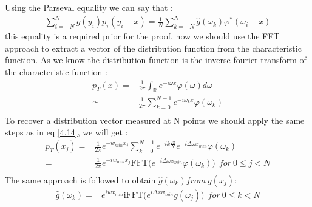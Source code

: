 \documentclass[12pt]{report}
\begin{document}
Using the Parseval equality we can say that :
\begin{align}
\sum_{i=-N}^{N}g(y_i)p_{\tau}(y_i-x)=\frac{1}{N}\sum_{k=-N}^{N}\hat {g}(\omega_k)\varphi^*(\omega_i-x)
\end{align}
this equality is a required prior for the proof, now we should use the FFT approach to extract a vector of the distribution function from the characteristic function.
As we know the distribution function is the inverse fourier transform of the characteristic function :
\begin{align*}
p_T(x)=&\frac{1}{2 \pi}\int_{\mathbb{R}}e^{-i \omega x } \varphi(\omega) d\omega\\
\simeq &\frac{1}{2 \pi}\sum_{k=0}^{N-1}e^{-i \omega_k x } \varphi(\omega_k) \\
\end{align*}
To recover a distribution vector measured at N points we should  apply the same steps as in eq \eqref{4.14}, we will get :
\begin{align*}
p_T(x_j)=&\frac{1}{2 \pi} e^{- w_{min} x_j}\sum_{k=0}^{N-1} e^{- i k \frac{2 \pi}{N}} e^{-i \Delta\omega x_{min} } \varphi(\omega_k) \\
=&\frac{1}{2 \pi} e^{- iw_{min} x_j} \text{FFT}\big ( e^{-i \Delta\omega x_{min} } \varphi(\omega_k) \big) ~~for~ 0 \leqslant j < N\\
\end{align*}
The same approach is followed to obtain ${\hat g (\omega_k) } from ~g(x_j)$:
\begin{align*}
\hat g (\omega_k)=& e^{i w x_{min}} \text{iFFT}\big ( e^{i \Delta x w_{min} } g(\omega_j) \big) ~~for~ 0 \leqslant k < N\\
\end{align*}
\end{document}

